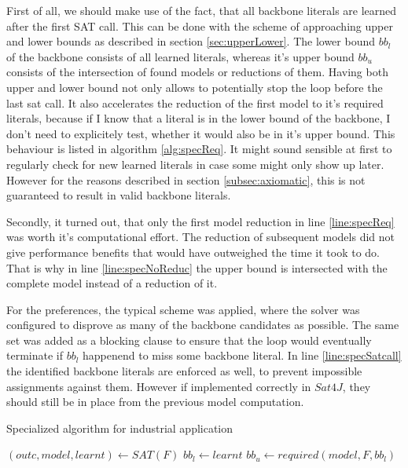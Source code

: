 First of all, we should make use of the fact, that all backbone literals are learned after the first SAT call. This can be done with the scheme of approaching upper and lower bounds as described in section \ref{sec:upperLower}. The lower bound $bb_l$ of the backbone consists of all learned literals, whereas it's upper bound $bb_u$ consists of the intersection of found models or reductions of them. Having both upper and lower bound not only allows to potentially stop the loop before the last sat call. It also accelerates the reduction of the first model to it's required literals, because if I know that a literal is in the lower bound of the backbone, I don't need to explicitely test, whether it would also be in it's upper bound. This behaviour is listed in algorithm \ref{alg:specReq}. It might sound sensible at first to regularly check for new learned literals in case some might only show up later. However for the reasons described in section \ref{subsec:axiomatic}, this is not guaranteed to result in valid backbone literals.

Secondly, it turned out, that only the first model reduction in line \ref{line:specReq} was worth it's computational effort. The reduction of subsequent models did not give performance benefits that would have outweighed the time it took to do. That is why in line \ref{line:specNoReduc} the upper bound is intersected with the complete model instead of a reduction of it.

For the preferences, the typical scheme was applied, where the solver was configured to disprove as many of the backbone candidates as possible. The same set was added as a blocking clause to ensure that the loop would eventually terminate if $bb_l$ happenend to miss some backbone literal. In line \ref{line:specSatcall} the identified backbone literals are enforced as well, to prevent impossible assignments against them. However if implemented correctly in $Sat4J$, they should still be in place from the previous model computation.



\begin{algorithm}
\caption{{\sc Specialized algorithm for industrial application}}
\label{alg:thoreSpecial}
\DontPrintSemicolon
{}
$(outc,model,learnt) \gets SAT(F)$\;
$bb_l \gets learnt$\;
$bb_u \gets required(model,F,bb_l)$\;
\label{line:specReq}
\end{algorithm}


